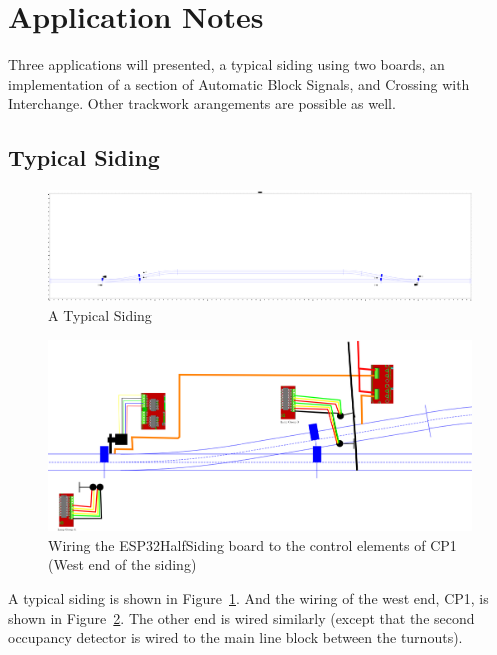 \clearpage
\section{Application Notes}

Three applications will presented, a typical siding using two boards, an 
implementation of a section of Automatic Block Signals, and Crossing with 
Interchange.  Other trackwork arangements are possible as well.


\subsection{Typical Siding}

\begin{figure}[hbpt]\begin{centering}%
\includegraphics[width=5in]{ExampleSiding.png}
\caption{A Typical Siding}
\label{fig:ExampleSiding}
\end{centering}\end{figure}
\begin{figure}[hbpt]\begin{centering}%
\includegraphics[width=5in]{ESP32HalfSiding-CP1Wiring.png}
\caption{Wiring the ESP32HalfSiding board to the control elements of CP1 (West 
end of the siding)}
\label{fig:ESP32HalfSiding-CP1Wiring}
\end{centering}\end{figure}
A typical siding is shown in Figure~\ref{fig:ExampleSiding}. And the wiring of 
the west end, CP1, is shown in Figure~\ref{fig:ESP32HalfSiding-CP1Wiring}. The 
other end is wired similarly (except that the second occupancy detector is 
wired to the main line block between the turnouts).

